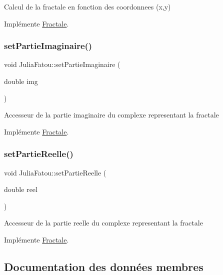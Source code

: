 Calcul de la fractale en fonction des coordonnees (x,y) 

Implémente \hyperlink{classFractale_a99a54c1b9b847ca24585f469cf03b67a}{Fractale}.

\mbox{\label{classJuliaFatou_a99b8e79f86a6a189f861f8273b1a6405}} 
\subsubsection{\texorpdfstring{set\+Partie\+Imaginaire()}{setPartieImaginaire()}}
{\footnotesize\ttfamily void Julia\+Fatou\+::set\+Partie\+Imaginaire (\begin{DoxyParamCaption}\item[{double}]{img }\end{DoxyParamCaption})\hspace{0.3cm}{\ttfamily [virtual]}}

Accesseur de la partie imaginaire du complexe representant la fractale 

Implémente \hyperlink{classFractale_ab2dc26f50f2b0a3cbe986986075fe8f5}{Fractale}.

\mbox{\label{classJuliaFatou_a5b89c7a96e48d5bdc0b044454fae0113}} 
\subsubsection{\texorpdfstring{set\+Partie\+Reelle()}{setPartieReelle()}}
{\footnotesize\ttfamily void Julia\+Fatou\+::set\+Partie\+Reelle (\begin{DoxyParamCaption}\item[{double}]{reel }\end{DoxyParamCaption})\hspace{0.3cm}{\ttfamily [virtual]}}

Accesseur de la partie reelle du complexe representant la fractale 

Implémente \hyperlink{classFractale_a535969c022c88b7968784e160f41e1c3}{Fractale}.



\subsection{Documentation des données membres}
\mbox{\label{classJuliaFatou_aa282b95e3801401a80a96adedaff11d0}} 
